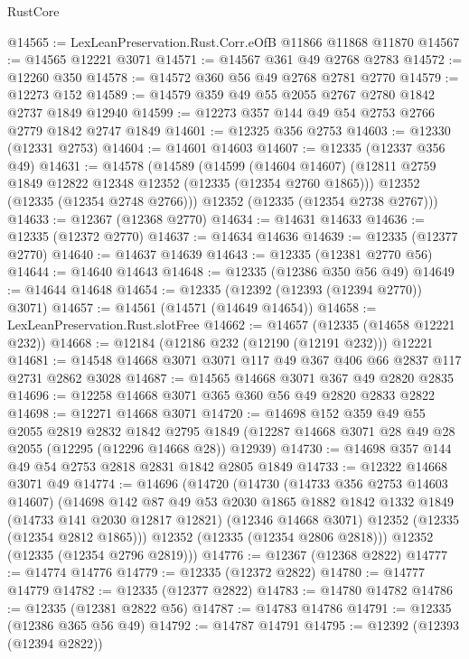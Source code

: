 \begin{lexlean}{RustCore}
\begin{coremodule}
@14565 := LexLeanPreservation.Rust.Corr.eOfB @11866 @11868 @11870
@14567 := @14565 @12221 @3071
@14571 := @14567 @361 @49 @2768 @2783
@14572 := @12260 @350
@14578 := @14572 @360 @56 @49 @2768 @2781 @2770
@14579 := @12273 @152
@14589 := @14579 @359 @49 @55 @2055 @2767 @2780 @1842 @2737 @1849 @12940
@14599 := @12273 @357 @144 @49 @54 @2753 @2766 @2779 @1842 @2747 @1849
@14601 := @12325 @356 @2753
@14603 := @12330 (@12331 @2753)
@14604 := @14601 @14603
@14607 := @12335 (@12337 @356 @49)
@14631 := @14578
    (@14589
      (@14599
        (@14604 @14607)
        (@12811 @2759 @1849 @12822 @12348 @12352 (@12335 (@12354 @2760 @1865)))
        @12352
        (@12335 (@12354 @2748 @2766)))
      @12352
      (@12335 (@12354 @2738 @2767)))
@14633 := @12367 (@12368 @2770)
@14634 := @14631 @14633
@14636 := @12335 (@12372 @2770)
@14637 := @14634 @14636
@14639 := @12335 (@12377 @2770)
@14640 := @14637 @14639
@14643 := @12335 (@12381 @2770 @56)
@14644 := @14640 @14643
@14648 := @12335 (@12386 @350 @56 @49)
@14649 := @14644 @14648
@14654 := @12335 (@12392 (@12393 (@12394 @2770)) @3071)
@14657 := @14561 (@14571 (@14649 @14654))
@14658 := LexLeanPreservation.Rust.slotFree
@14662 := @14657 (@12335 (@14658 @12221 @232))
@14668 := @12184 (@12186 @232 (@12190 (@12191 @232))) @12221
@14681 := @14548 @14668 @3071 @3071 @117 @49 @367 @406 @66 @2837 @117 @2731 @2862 @3028
@14687 := @14565 @14668 @3071 @367 @49 @2820 @2835
@14696 := @12258 @14668 @3071 @365 @360 @56 @49 @2820 @2833 @2822
@14698 := @12271 @14668 @3071
@14720 := @14698
    @152
    @359
    @49
    @55
    @2055
    @2819
    @2832
    @1842
    @2795
    @1849
    (@12287 @14668 @3071 @28 @49 @28 @2055 (@12295 (@12296 @14668 @28)) @12939)
@14730 := @14698 @357 @144 @49 @54 @2753 @2818 @2831 @1842 @2805 @1849
@14733 := @12322 @14668 @3071 @49
@14774 := @14696
    (@14720
      (@14730
        (@14733 @356 @2753 @14603 @14607)
        (@14698
          @142
          @87
          @49
          @53
          @2030
          @1865
          @1882
          @1842
          @1332
          @1849
          (@14733 @141 @2030 @12817 @12821)
          (@12346 @14668 @3071)
          @12352
          (@12335 (@12354 @2812 @1865)))
        @12352
        (@12335 (@12354 @2806 @2818)))
      @12352
      (@12335 (@12354 @2796 @2819)))
@14776 := @12367 (@12368 @2822)
@14777 := @14774 @14776
@14779 := @12335 (@12372 @2822)
@14780 := @14777 @14779
@14782 := @12335 (@12377 @2822)
@14783 := @14780 @14782
@14786 := @12335 (@12381 @2822 @56)
@14787 := @14783 @14786
@14791 := @12335 (@12386 @365 @56 @49)
@14792 := @14787 @14791
@14795 := @12392 (@12393 (@12394 @2822))

\end{coremodule}
\end{lexlean}
